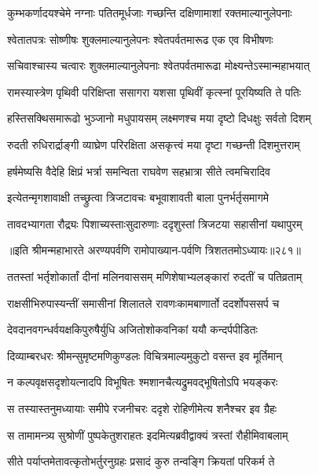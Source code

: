 \twolineshloka
{कुम्भकर्णादयश्चेमे नग्नाः पतितमूर्धजाः}
{गच्छन्ति दक्षिणामाशां रक्तमाल्यानुलेपनाः}


\twolineshloka
{श्वेतातपत्रः सोष्णीषः शुक्लमाल्यानुलेपनः}
{श्वेतपर्वतमारूढ एक एव विभीषणः}


\twolineshloka
{सचिवाश्चास्य चत्वारः शुक्लमाल्यानुलेपनाः}
{श्वेतपर्वतमारूढा मोक्ष्यन्तेऽस्मान्महाभयात्}


\twolineshloka
{रामस्यास्त्रेण पृथिवी परिक्षिप्ता ससागरा}
{यशसा पृथिवीं कृत्स्नां पूरयिष्यति ते पतिः}


\twolineshloka
{हस्तिसक्थिसमारूढो भुञ्जानो मधुपायसम्}
{लक्ष्मणश्च मया दृष्टो दिधक्षुः सर्वतो दिशम्}


\twolineshloka
{रुदती रुधिरार्द्राङ्गी व्याघ्रेण परिरक्षिता}
{असकृत्त्वं मया दृष्टा गच्छन्ती दिशमुत्तराम्}


\twolineshloka
{हर्षमेष्यसि वैदेहि क्षिप्रं भर्त्रा समन्विता}
{राघवेण सहभ्रात्रा सीते त्वमचिरादिव}


\twolineshloka
{इत्येतन्मृगशावाक्षी तच्छ्रुत्वा त्रिजटावचः}
{बभूवाशावती बाला पुनर्भर्तृसमागमे}


\twolineshloka
{तावदभ्यागता रौद्र्यः पिशाच्यस्ताःसुदारुणाः}
{ददृशुस्तां त्रिजटया सहासीनां यथापुरम्}


॥इति श्रीमन्महाभारते अरण्यपर्वणि रामोपाख्यान-पर्वणि त्रिशततमोऽध्यायः॥२८१॥

\storymeta

\resetShloka



\twolineshloka
{ततस्तां भर्तृशोकार्तां दीनां मलिनवाससम्}
{मणिशेषाभ्यलङ्कारां रुदतीं च पतिव्रताम्}


\twolineshloka
{राक्षसीभिरुपास्यन्तीं समासीनां शिलातले}
{रावणःकामबाणार्तो ददर्शोपससर्प च}


\twolineshloka
{देवदानवगन्धर्वयक्षकिपुरुषैर्युधि}
{अजितोशोकवनिकां ययौ कन्दर्पपीडितः}


\twolineshloka
{दिव्याम्बरधरः श्रीमन्सुमृष्टमणिकुण्डलः}
{विचित्रमाल्यमुकुटो वसन्त इव मूर्तिमान्}


\twolineshloka
{न कल्पवृक्षसदृशोयत्नादपि विभूषितः}
{श्मशानचैत्यद्रुमवद्भूषितोऽपि भयङ्करः}


\twolineshloka
{स तस्यास्तनुमध्यायाः समीपे रजनीचरः}
{ददृशे रोहिणीमेत्य शनैश्चर इव ग्रैहः}


\twolineshloka
{स तामामन्त्र्य सुश्रोणीं पुष्पकेतुशराहतः}
{इदमित्यब्रवीद्वाक्यं त्रस्तां रौहीमिवाबलाम्}


\twolineshloka
{सीते पर्याप्तमेतावत्कृतोभर्तुरनुग्रहः}
{प्रसादं कुरु तन्वङ्गि क्रियतां परिकर्म ते}


